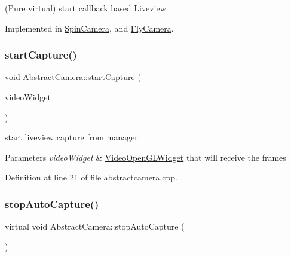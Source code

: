 (Pure virtual) start callback based Liveview 



Implemented in \mbox{\hyperlink{class_spin_camera_acee6b2c38898f23b5bbba4a7810caa49}{Spin\+Camera}}, and \mbox{\hyperlink{class_fly_camera_aa91c2cd580029a1fb242e2d8dace33b7}{Fly\+Camera}}.

\mbox{\label{class_abstract_camera_abbbf7accb8254546aace4e2affa2467c}} 
\subsubsection{\texorpdfstring{startCapture()}{startCapture()}}
{\footnotesize\ttfamily void Abstract\+Camera\+::start\+Capture (\begin{DoxyParamCaption}\item[{\mbox{\hyperlink{class_video_open_g_l_widget}{Video\+Open\+G\+L\+Widget}} $\ast$}]{video\+Widget }\end{DoxyParamCaption})}



start liveview capture from manager 


\begin{DoxyParams}{Parameters}
{\em video\+Widget} & \mbox{\hyperlink{class_video_open_g_l_widget}{Video\+Open\+G\+L\+Widget}} that will receive the frames \\
\hline
\end{DoxyParams}


Definition at line 21 of file abstractcamera.\+cpp.

\mbox{\label{class_abstract_camera_a08bd5e2c3f8a92187f36e1f6322eccb5}} 
\subsubsection{\texorpdfstring{stopAutoCapture()}{stopAutoCapture()}}
{\footnotesize\ttfamily virtual void Abstract\+Camera\+::stop\+Auto\+Capture (\begin{DoxyParamCaption}{ }\end{DoxyParamCaption})\hspace{0.3cm}{\ttfamily [pure virtual]}}



